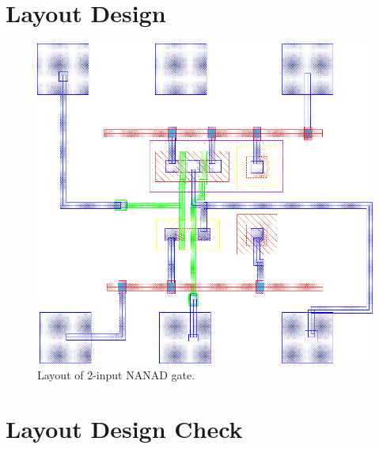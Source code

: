 \documentclass[11pt]{article}
\begin{document}
\section{Layout Design}
\begin{figure}[!h]
    \includegraphics[width=\textwidth,inner]{layout}
    \caption{Layout of 2-input NANAD gate.}
\end{figure}
\newpage
\section{Layout Design Check}
\end{document}
